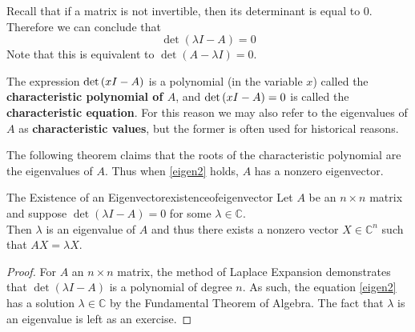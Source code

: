 Recall that if a matrix
is not invertible, then its determinant is equal to $0$.  Therefore we
can conclude that
\begin{equation}
\det \left( \lambda I - A\right) =0  \label{eigen2}
\end{equation}
Note that this is equivalent to $\det \left(A- \lambda I \right) =0$. 

The expression $\det \left( x I-A\right) $ is a polynomial (in
the variable $x$) called the
\textbf{characteristic polynomial of $A$}, and 
$\det \left( x I-A\right) =0$ is called the \textbf{characteristic
equation}.  For this reason we may also refer to
the eigenvalues of $A$ as \textbf{characteristic values}, but the
former is often used for historical reasons.

The following theorem claims that the roots of the characteristic
polynomial are the eigenvalues of $A$.  Thus when \ref{eigen2}
holds, $A$ has a nonzero eigenvector.

\begin{theorem}{The Existence of an Eigenvector}{existenceofeigenvector}
Let $A$ be an $n\times n$ matrix and suppose $\det \left( \lambda I -
A\right) =0$ for some $ \lambda \in \mathbb{C}$.  \\
Then $\lambda$ is an eigenvalue of $A$ and thus there exists a nonzero
vector $X \in \mathbb{C}^{n}$ such that $AX=\lambda X$. 
\end{theorem}

\begin{proof}
For $A$ an $n\times n$ matrix, the method of Laplace
Expansion demonstrates that $\det \left( \lambda I - A \right) $ is a
polynomial of degree $n.$ As such, the equation
\ref{eigen2} has a solution $\lambda \in \mathbb{C}$ by the Fundamental
Theorem of Algebra. The fact that $\lambda$ is an eigenvalue is left as an exercise. 
\end{proof}